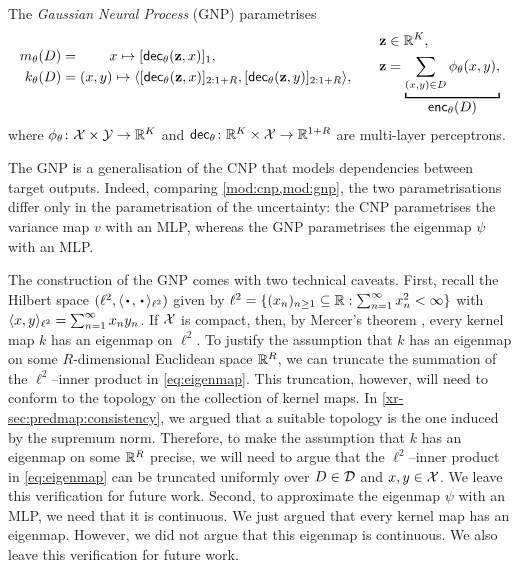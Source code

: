 \documentclass[12pt]{report}
\newcommand{\xrprefix}[1]{xr-#1}
\begin{document}
\begin{model}
    \label{mod:gnp}
    The \emph{Gaussian Neural Process} (GNP) parametrises
    \begin{equation*}
        \begin{aligned}
            m_\theta(D) &= \hspace{21pt} x \mapsto [\dec_\theta(\vz, x)]_1, \\
            k_\theta(D) &= (x, y) \mapsto \lra{[\dec_\theta(\vz, x)]_{2:1+R}, [\dec_\theta(\vz, y)]_{2:1+R}}, \\[1em]
        \end{aligned}
        \qquad
        \begin{aligned}
            \vz &\in \R^{K}, \\
            \vz &= \underbracket[1pt]{
                \sum_{(x, y) \in D} \phi_\theta(x, y),
            }_{
                \displaystyle\enc_\theta(D)
            } \\
        \end{aligned}
    \end{equation*}
    where $\phi_\theta\colon \mathcal{X} \times \mathcal{Y} \to \mathbb{R}^{K}$ and  $\mathsf{dec}_\theta \colon \mathbb{R}^{K} \times \mathcal{X} \to \mathbb{R}^{1 + R}$ are multi-layer perceptrons.
\end{model}

The GNP is a generalisation of the CNP that models dependencies between target outputs.
Indeed, comparing \cref{mod:cnp,mod:gnp}, the two parametrisations differ only in the parametrisation of the uncertainty:
the CNP parametrises the variance map $v$ with an MLP, whereas the GNP parametrises the eigenmap $\psi$ with an MLP.

The construction of the GNP comes with two technical caveats.
First, 
recall the Hilbert space $(\ell^2, \lra{\vardot, \vardot}_{\ell^2})$ given by
$\ell^2 = \{(x_n)_{n \ge 1} \subseteq \mathbb{R} : \sum_{n=1}^\infty x_n^2 < \infty\}$
with
$\langle x, y\rangle_{\ell^2} = \sum_{n =1}^\infty x_n y_n$.
If $\mathcal{X}$ is compact, 
then, by Mercer's theorem \parencite[Theorem 3.3.1;][]{Adler:1981:The_Geometry_of_Random_Fields},
every kernel map $k$ has an eigenmap on $\ell^2$.
To justify the assumption that $k$ has an eigenmap on some $R$-dimensional Euclidean space $\mathbb{R}^R$, we can truncate the summation of the $\ell^2$--inner product in \eqref{eq:eigenmap}.
This truncation, however, will need to conform to the topology on the collection of kernel maps. 
In \cref{\xrprefix{sec:predmap:consistency}}, we argued that a suitable topology is the one induced by the supremum norm.
Therefore, to make the assumption that $k$ has an eigenmap on some $\mathbb{R}^R$ precise, we will need to argue that the $\ell^2$--inner product in \eqref{eq:eigenmap} can be truncated uniformly over $D \in \mathcal{D}$ and $x, y \in \mathcal{X}$.
We leave this verification for future work.
Second, to approximate the eigenmap $\psi$ with an MLP, we need that it is continuous.
We just argued that every kernel map has an eigenmap.
However, we did not argue that this eigenmap is continuous.
We also leave this verification for future work.
\end{document}
